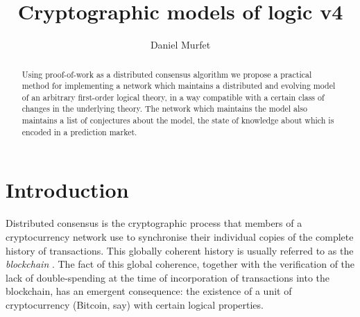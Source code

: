 \documentclass[english,letter paper,12pt,reqno]{article}
\theoremstyle{example}
\def\res{\operatorname{Res}}
\begin{document}
\def\ScoreOverhang{1pt}

\def\Res{\res\!}
\newcommand{\ud}[1]{\operatorname{d}\!{#1}}
\newcommand{\Ress}[1]{\res_{#1}\!}
\newcommand{\cat}[1]{\mathcal{#1}}
\newcommand{\lto}{\longrightarrow}
\newcommand{\xlto}[1]{\stackrel{#1}\lto}
\newcommand{\mf}[1]{\mathfrak{#1}}
\newcommand{\md}[1]{\mathscr{#1}}
\newcommand{\church}[1]{\underline{#1}}
\newcommand{\prf}[1]{\underline{#1}}
\newcommand{\den}[1]{\llbracket #1 \rrbracket}
\def\l{\,|\,}
\def\sgn{\textup{sgn}}
\def\cont{\operatorname{cont}}

\title{Cryptographic models of logic v4}
\author{Daniel Murfet}

\maketitle

\begin{abstract} Using proof-of-work as a distributed consensus algorithm we propose a practical method for implementing a network which maintains a distributed and evolving model of an arbitrary first-order logical theory, in a way compatible with a certain class of changes in the underlying theory. The network which maintains the model also maintains a list of conjectures about the model, the state of knowledge about which is encoded in a prediction market.
\end{abstract}



\section{Introduction}

Distributed consensus is the cryptographic process that members of a cryptocurrency network use to synchronise their individual copies of the complete history of transactions. This globally coherent history is usually referred to as the \emph{blockchain} \cite{satoshi}. The fact of this global coherence, together with the verification of the lack of double-spending at the time of incorporation of transactions into the blockchain, has an emergent consequence: the existence of a unit of cryptocurrency (Bitcoin, say) with certain logical properties.
\end{document}
